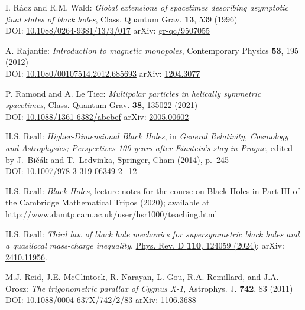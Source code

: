 \begin{thebibliography}{123}
I. R\'acz and R.M. Wald:
{\em Global extensions of spacetimes describing asymptotic final states of black holes},
Class. Quantum Grav. {\bf 13}, 539 (1996)\\
DOI: \href{https://doi.org/10.1088/0264-9381/13/3/017}{10.1088/0264-9381/13/3/017}\hfill
arXiv: \href{https://arxiv.org/abs/gr-qc/9507055}{gr-qc/9507055}

A. Rajantie:
{\em Introduction to magnetic monopoles},
Contemporary Physics {\bf 53}, 195 (2012)\\
DOI: \href{https://doi.org/10.1080/00107514.2012.685693}{10.1080/00107514.2012.685693}\hfill
arXiv: \href{https://arxiv.org/abs/1204.3077}{1204.3077}

P. Ramond and A. Le Tiec:
{\em Multipolar particles in helically symmetric spacetimes},
Class. Quantum Grav. {\bf 38}, 135022 (2021)\\
DOI: \href{https://doi.org/10.1088/1361-6382/abebef}{10.1088/1361-6382/abebef}\hfill
arXiv: \href{https://arxiv.org/abs/2005.00602}{2005.00602}

H.S. Reall:
{\em Higher-Dimensional Black Holes},
in {\em  General Relativity, Cosmology and Astrophysics; Perspectives 100 years after Einstein's stay in Prague}, edited by J.~Bičák and T.~Ledvinka,
Springer, Cham (2014), p.~245\\
DOI: \href{https://doi.org/10.1007/978-3-319-06349-2_12}{10.1007/978-3-319-06349-2\_12}

H.S. Reall: {\em Black Holes}, lecture notes for the course on Black Holes in
Part III of the Cambridge Mathematical Tripos (2020); available at\\
\url{http://www.damtp.cam.ac.uk/user/hsr1000/teaching.html}

H.S. Reall:
{\em Third law of black hole mechanics for supersymmetric black holes and a quasilocal mass-charge inequality},
\href{https://doi.org/10.1103/PhysRevD.110.124059}{Phys. Rev. D {\bf 110}, 124059 (2024)};
arXiv: \href{https://arxiv.org/abs/2410.11956}{2410.11956}.

M.J. Reid, J.E. McClintock, R. Narayan, L. Gou, R.A. Remillard, and J.A. Orosz:
{\em The trigonometric parallax of Cygnus X-1},
Astrophys. J. {\bf 742}, 83 (2011)\\
DOI: \href{https://doi.org/10.1088/0004-637X/742/2/83}{10.1088/0004-637X/742/2/83}\hfill
arXiv: \href{https://arxiv.org/abs/1106.3688}{1106.3688}


\end{thebibliography}
